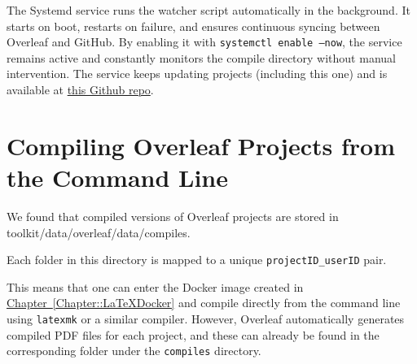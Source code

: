 The Systemd service runs the watcher script automatically in the background.
It starts on boot, restarts on failure, and ensures continuous syncing between
Overleaf and GitHub. By enabling it with \texttt{systemctl enable --now}, the
service remains active and constantly monitors the compile directory without
manual intervention. The service keeps updating projects (including this one) and is available at \href{https://github.com/IvanFarfan08/Overleaf_Files_SSW590F}{this Github repo}.

\section{Compiling Overleaf Projects from the Command Line}

We found that compiled versions of Overleaf projects are stored in 
toolkit/data/overleaf/data/compiles. 

Each folder in this directory is mapped to a unique \texttt{projectID\_userID} pair.

This means that one can enter the Docker image created in 
\hyperref[Chapter::LaTeXDocker]{Chapter~\ref*{Chapter::LaTeXDocker}} and compile directly from the 
command line using \texttt{latexmk} or a similar compiler.  
However, Overleaf automatically generates compiled PDF files for each project, 
and these can already be found in the corresponding folder under the 
\texttt{compiles} directory.